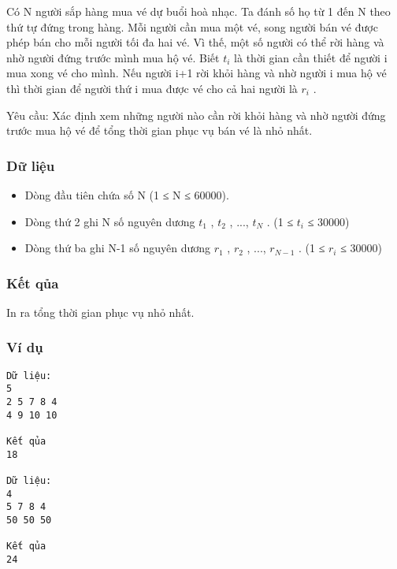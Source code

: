 



   Có N người sắp hàng mua vé dự buổi hoà nhạc. Ta đánh số họ từ 1 đến N theo thứ tự   đứng trong hàng. Mỗi người cần mua một vé, song người bán vé được phép bán cho mỗi   người tối đa hai vé. Vì thế, một số người có thể rời hàng và nhờ người đứng trước mình mua   hộ vé. Biết $t_{i}$   là thời gian cần thiết để người i mua xong vé cho mình. Nếu người   i+1 rời khỏi hàng và nhờ người i mua hộ vé thì thời gian để người thứ i mua được vé cho cả   hai người là $r_{i}$   .  

   Yêu cầu: Xác định xem những người nào cần rời khỏi hàng và nhờ người đứng trước mua   hộ vé để tổng thời gian phục vụ bán vé là nhỏ nhất.  

\subsubsection{   Dữ liệu  }
\begin{itemize}
	\item     Dòng đầu tiên chứa số N (1 ≤ N ≤ 60000).   
	\item     Dòng thứ 2 ghi N số nguyên dương $t_{1}$    , $t_{2}$    , ...,   $t_{N}$    . (1 ≤ $t_{i}$    ≤ 30000)   
	\item     Dòng thứ ba ghi N-1 số nguyên dương $r_{1}$    , $r_{2}$    , ...,   $r_{N-1}$    . (1 ≤ $r_{i}$    ≤ 30000)   
\end{itemize}

\subsubsection{   Kết qủa  }

   In ra tổng thời gian phục vụ nhỏ nhất.  

\subsubsection{   Ví dụ  }
\begin{verbatim}
Dữ liệu:
5
2 5 7 8 4
4 9 10 10 

Kết qủa
18

Dữ liệu:
4
5 7 8 4
50 50 50 

Kết qủa
24
\end{verbatim}
